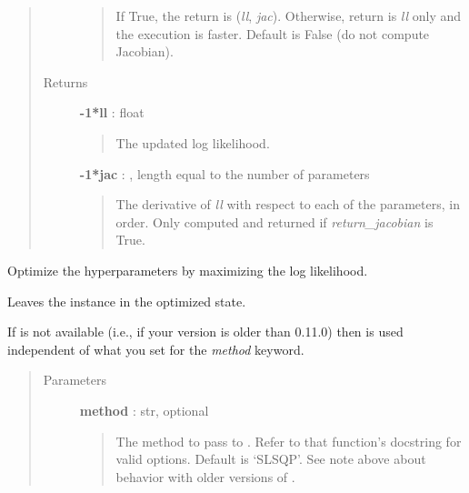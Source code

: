 \documentclass[letterpaper,10pt,english]{sphinxmanual}
\begin{document}
\begin{fulllineitems}
\begin{fulllineitems}
\begin{quote}
\begin{description}
\begin{quote}
If True, the return is (\emph{ll}, \emph{jac}). Otherwise, return is \emph{ll}
only and the execution is faster. Default is False (do not
compute Jacobian).
\end{quote}

\item[{Returns }] \leavevmode
\textbf{-1*ll} : float
\begin{quote}

The updated log likelihood.
\end{quote}

\textbf{-1*jac} : , length equal to the number of parameters
\begin{quote}

The derivative of \emph{ll} with respect to each of the parameters, in
order. Only computed and returned if \emph{return\_jacobian} is True.
\end{quote}

\end{description}\end{quote}

\end{fulllineitems}


\begin{fulllineitems}
\label{gptools:gptools.gaussian_process.GaussianProcess.optimize_hyperparameters}
Optimize the hyperparameters by maximizing the log likelihood.

Leaves the {\hyperref[gptools:gptools.gaussian_process.GaussianProcess]{}} instance in the optimized state.

If  is not available (i.e., if your
 version is older than 0.11.0) then 
is used independent of what you set for the \emph{method} keyword.
\begin{quote}\begin{description}
\item[{Parameters }] \leavevmode
\textbf{method} : str, optional
\begin{quote}

The method to pass to .
Refer to that function's docstring for valid options. Default
is `SLSQP'. See note above about behavior with older versions of
.
\end{quote}


\end{description}
\end{quote}
\end{fulllineitems}
\end{fulllineitems}
\end{document}
